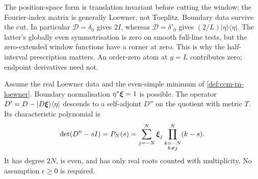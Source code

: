 The position-space form is translation invariant before cutting the
window; the Fourier-index matrix is generally Loewner, not Toeplitz.
Boundary data survive the cut. In particular $\mathcal D=\delta_0$
gives $2I$, whereas $\mathcal D=\delta'_0$ gives
$(2/L)|\eta\rangle\langle\eta|$. The latter's globally even
symmetrisation is zero on smooth full-line tests, but the zero-extended
window functions have a corner at zero. This is why the half-interval
prescription matters. An order-zero atom at $y=L$ contributes zero;
endpoint derivatives need not.

\begin{theorem}
\label{thm:ccm-tn-loewner-quotient}
Assume the real Loewner data and the even-simple minimum of
\cref{def:ccm-tn-loewner}. Boundary normalisation $\eta^*\boldsymbol{\xi}=1$
is possible. The operator $D'=D-|D\boldsymbol{\xi}\rangle\langle\eta|$
descends to a self-adjoint $D''$ on the quotient with metric $T$.
Its characteristic polynomial is
\[
 \det(D''-sI)=P_N(s)=\sum_{j=-N}^N\boldsymbol{\xi}_j
                      \prod_{\substack{k=-N\\k\ne j}}^N(k-s).
\]
It has degree $2N$, is even, and has only real roots counted with
multiplicity. No assumption $\epsilon\geq0$ is required.
\end{theorem}
